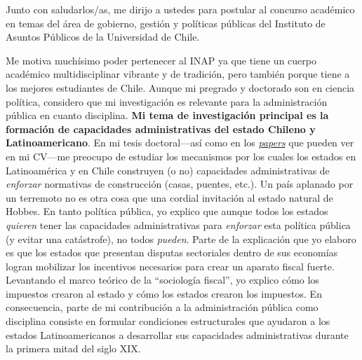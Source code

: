 \documentclass[12pt,stdletter,dateno,sigleft]{newlfm} %
\begin{document}
\begin{newlfm}


Junto con saludarlos/as, me dirijo a ustedes para postular al concurso acad\'emico en temas del \'area de gobierno, gesti\'on y pol\'iticas p\'ublicas del Instituto de Asuntos P\'ublicos de la Universidad de Chile. 

Me motiva much\'isimo poder pertenecer al INAP ya que tiene un cuerpo acad\'emico multidisciplinar vibrante y de tradici\'on, pero tambi\'en porque tiene a los mejores estudiantes de Chile. Aunque mi pregrado y doctorado son en ciencia pol\'itica, considero que mi investigaci\'on es relevante para la administraci\'on p\'ublica en cuanto disciplina. {\bf Mi tema de investigaci\'on principal es la formaci\'on de capacidades administrativas del estado Chileno y Latinoamericano}. En mi tesis doctoral---as\'i como en los \href{https://github.com/hbahamonde/Earthquake_Paper/raw/master/Bahamonde_Earthquake_Paper.pdf}{\emph{papers}} que pueden ver en mi CV---me preocupo de estudiar los mecanismos por los cuales los estados en Latinoam\'erica y en Chile construyen (o no) capacidades administrativas de \emph{enforzar} normativas de construcci\'on (casas, puentes, etc.). Un pa\'is aplanado por un terremoto no es otra cosa que una cordial invitaci\'on al estado natural de Hobbes. En tanto pol\'itica p\'ublica, yo explico que aunque todos los estados \emph{quieren} tener las capacidades administrativas para \emph{enforzar} esta pol\'itica p\'ublica (y evitar una cat\'astrofe), no todos \emph{pueden}. Parte de la explicaci\'on que yo elaboro es que los estados que presentan disputas sectoriales dentro de sus econom\'ias logran mobilizar los incentivos necesarios para crear un aparato fiscal fuerte. Levantando el marco te\'orico de la ``sociolog\'ia fiscal'', yo explico c\'omo los impuestos crearon al estado y c\'omo los estados crearon los impuestos. En consecuencia, parte de mi contribuci\'on a la administraci\'on p\'ublica como disciplina consiste en formular condiciones estructurales que ayudaron a los estados Latinoamericanos a desarrollar sus capacidades administrativas durante la primera mitad del siglo XIX. 


\end{newlfm}
\end{document}
